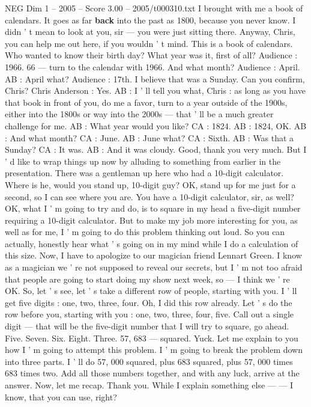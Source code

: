 \begin{textsample}{NEG Dim 1 – 2005 – Score 3.00 – 2005/t000310.txt}
I brought with me a book of calendars.
It goes as far \textbf{back} into the past as 1800, because you never know.
I didn ' t mean to look at you, sir — you were just sitting there.
Anyway, Chris, you can help me out here, if you wouldn ' t mind.
This is a book of calendars.
Who wanted to know their birth day?
What year was it, first of all?
Audience : 1966. 66 — turn to the calendar with 1966.
And what month?
Audience : April.
AB : April what?
Audience : 17th.
I believe that was a Sunday.
Can you confirm, Chris?
Chris Anderson : Yes.
AB : I ' ll tell you what, Chris : as long as you have that book in front of you, do me a favor, turn to a year outside of the 1900s, either into the 1800s or way into the 2000s — that ' ll be a much greater challenge for me.
AB : What year would you like?
CA : 1824.
AB : 1824, OK.
AB : And what month?
CA : June.
AB : June what?
CA : Sixth.
AB : Was that a Sunday?
CA : It was.
AB : And it was cloudy.
Good, thank you very much.
But I ' d like to wrap things up now by alluding to something from earlier in the presentation.
There was a gentleman up here who had a 10-digit calculator.
Where is he, would you stand up, 10-digit guy?
OK, stand up for me just for a second, so I can see where you are.
You have a 10-digit calculator, sir, as well?
OK, what I ' m going to try and do, is to square in my head a five-digit number requiring a 10-digit calculator.
But to make my job more interesting for you, as well as for me, I ' m going to do this problem thinking out loud.
So you can actually, honestly hear what ' s going on in my mind while I do a calculation of this size.
Now, I have to apologize to our magician friend Lennart Green.
I know as a magician we ' re not supposed to reveal our secrets, but I ' m not too afraid that people are going to start doing my show next week, so — I think we ' re OK.
So, let ' s see, let ' s take a different row of people, starting with you.
I ' ll get five digits : one, two, three, four.
Oh, I did this row already.
Let ' s do the row before you, starting with you : one, two, three, four, five.
Call out a single digit — that will be the five-digit number that I will try to square, go ahead.
Five.
Seven.
Six.
Eight.
Three. 57, 683 — squared.
Yuck.
Let me explain to you how I ' m going to attempt this problem.
I ' m going to break the problem down into three parts.
I ' ll do 57, 000 squared, plus 683 squared, plus 57, 000 times 683 times two.
Add all those numbers together, and with any luck, arrive at the answer.
Now, let me recap.
Thank you.
While I explain something else — — I know, that you can use, right?

\end{textsample}
